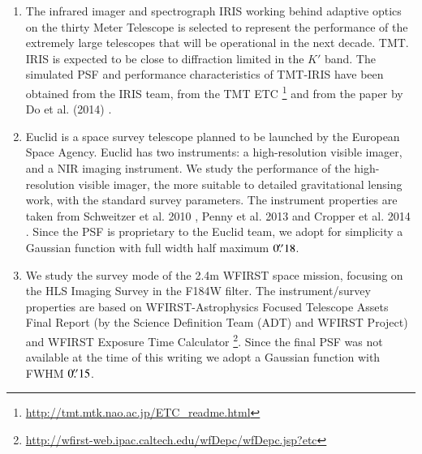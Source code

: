 \documentclass[a4paper,11pt]{article}
\begin{document}
\begin{enumerate}
\item The infrared imager and spectrograph IRIS \citep{2010SPIE.7735E..29L} working behind adaptive optics on the thirty Meter Telescope is selected to represent the performance of the extremely large telescopes that will be operational in the next decade. TMT. IRIS is expected to be close to diffraction limited in the $K'$ band. The simulated PSF and performance characteristics of TMT-IRIS have been obtained from the IRIS team, from the TMT ETC \footnote{\url{http://tmt.mtk.nao.ac.jp/ETC_readme.html}} and from the paper by Do et al. (2014) \citep{2014AJ....147...93D}.
    
\item Euclid is a space survey telescope planned to be launched by the European Space Agency. Euclid has two instruments: a high-resolution visible imager, and a NIR imaging instrument.
We study the performance of the high-resolution visible imager, the
more suitable to detailed gravitational lensing work, with the
standard survey parameters.  The instrument properties are taken from
Schweitzer et al. 2010
\cite{2010SPIE.7731E..1KS}, Penny et al. 2013
\cite{2013MNRAS.434....2P} and Cropper et al. 2014
\cite{2014SPIE.9143E..0JC}.
Since the PSF is proprietary to the Euclid team, we adopt for simplicity a Gaussian function with full width half maximum $0\hbox{$.\!\!^{\prime\prime}$}18$.
  
\item We study the survey mode of the 2.4m WFIRST space mission, focusing on the HLS Imaging Survey in the F184W filter.
The instrument/survey properties are based on WFIRST-Astrophysics Focused Telescope Assets Final Report (by the Science Definition Team (ADT) and WFIRST Project) and WFIRST Exposure Time Calculator \footnote{\url{http://wfirst-web.ipac.caltech.edu/wfDepc/wfDepc.jsp?etc}}. Since the final PSF was not available at the time of this writing we adopt a Gaussian function with FWHM $0\hbox{$.\!\!^{\prime\prime}$}15$.
     

\end{enumerate}
\end{document}
